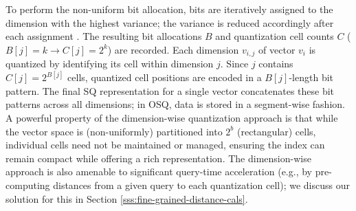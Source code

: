 To perform the non-uniform bit allocation, bits are iteratively assigned to the dimension with the highest variance; the variance is reduced accordingly after each assignment \cite{gersho2012vector}.
The resulting bit allocations $B$ and quantization cell counts $C$ ($B[j] = k \rightarrow C[j] = 2^k$) are recorded. 
Each dimension $v_{i,j}$ of vector $v_i$ is quantized by identifying its cell within dimension $j$.
Since $j$ contains $C[j] = 2^{B[j]}$ cells, quantized cell positions are encoded in a $B[j]$-length bit pattern. 
The final SQ representation for a single vector concatenates these bit patterns across all dimensions; in OSQ, data is stored in a segment-wise fashion.
A powerful property of the dimension-wise quantization approach is that while the vector space is (non-uniformly) partitioned into $2^b$ (rectangular) cells, individual cells need not be maintained or managed, ensuring the index can remain compact while offering a rich representation.
The dimension-wise approach is also amenable to significant query-time acceleration (e.g., by pre-computing distances from a given query to each quantization cell); we discuss our solution for this in Section \ref{sss:fine-grained-distance-cals}.






